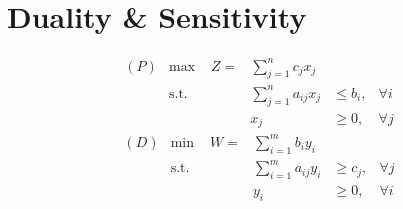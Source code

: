 \documentclass[10pt, twocolumn]{article}
\begin{document}
\section*{Duality \& Sensitivity}
\[ \boxed{\begin{array}{ccrlll} (P)
& \text{max } & Z = & \sum_{j=1}^nc_jx_j & & \\
& \text{s.t.} & & \sum_{j=1}^na_{ij}x_j & \leq b_i, & \forall i \\
& & & x_j & \geq 0, & \forall j 
\end{array}} \]
\[ \boxed{\begin{array}{ccrlll} (D)
& \text{min } & W = & \sum_{i=1}^mb_iy_i & & \\
& \text{s.t.} & & \sum_{i=1}^ma_{ij}y_i & \geq c_j, & \forall j \\
& & & y_i & \geq 0, & \forall i
\end{array}} \]
\end{document}
